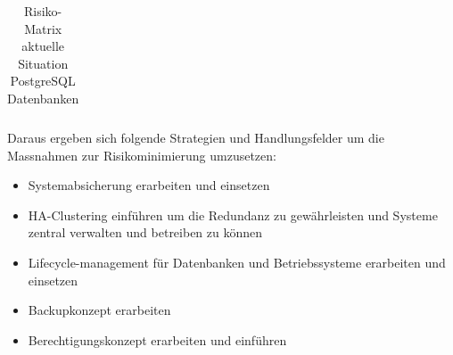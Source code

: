 \begin{flushleft}
\begin{table}[]
{\begin{tabular}{llllllllllll}
    \end{tabular}%
    }
    \caption{Risiko-Matrix aktuelle Situation PostgreSQL Datenbanken}
    \label{tab:riskmatrix-postgresql}
    \end{table}
\end{flushleft}
\begin{flushleft}

\end{flushleft}
\begin{flushleft}
    \recalctypearea
    Daraus ergeben sich folgende Strategien und Handlungsfelder um die Massnahmen zur Risikominimierung umzusetzen:
    \begin{itemize}
        \item Systemabsicherung erarbeiten und einsetzen
        \item HA-Clustering einführen um die Redundanz zu gewährleisten und Systeme zentral verwalten und betreiben zu können
        \item Lifecycle-management für Datenbanken und Betriebssysteme erarbeiten und einsetzen
        \item Backupkonzept erarbeiten
        \item Berechtigungskonzept erarbeiten und einführen
    \end{itemize}
\end{flushleft}
